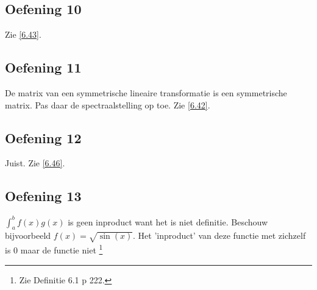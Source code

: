 \documentclass[lineaire_algebra_oplossingen.tex]{subfiles}
\begin{document}
\subsection{Oefening 10}
Zie \ref{6.43}.

\subsection{Oefening 11}
De matrix van een symmetrische lineaire transformatie is een symmetrische matrix. Pas daar de spectraalstelling op toe. Zie \ref{6.42}.

\subsection{Oefening 12}
Juist. Zie \ref{6.46}.

\subsection{Oefening 13}
$\int_a^bf(x)g(x)$ is geen inproduct want het is niet definitie. Beschouw bijvoorbeeld $f(x) = \sqrt{\sin(x)}$. Het 'inproduct' van deze functie met zichzelf is $0$ maar de functie niet \footnote{Zie Definitie 6.1 p 222.}
\end{document}
